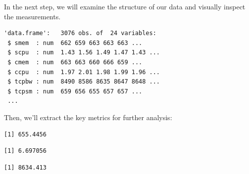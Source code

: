 In the next step, we will examine the structure of our data and visually
inspect the measurements.

\begin{Shaded}
\begin{Highlighting}[]
\end{Highlighting}
\end{Shaded}

\begin{verbatim}
'data.frame':   3076 obs. of  24 variables:
 $ smem  : num  662 659 663 663 663 ...
 $ scpu  : num  1.43 1.56 1.49 1.47 1.43 ...
 $ cmem  : num  663 663 660 666 659 ...
 $ ccpu  : num  1.97 2.01 1.98 1.99 1.96 ...
 $ tcpbw : num  8490 8586 8635 8647 8648 ...
 $ tcpsm : num  659 656 655 657 657 ...
 ...
\end{verbatim}

Then, we'll extract the key metrics for further analysis:

\begin{Shaded}
\begin{Highlighting}[]
\SpecialCharTok{\$}
\end{Highlighting}
\end{Shaded}

\begin{verbatim}
[1] 655.4456
\end{verbatim}

\begin{Shaded}
\begin{Highlighting}[]
\SpecialCharTok{\$}
\end{Highlighting}
\end{Shaded}

\begin{verbatim}
[1] 6.697056
\end{verbatim}

\begin{Shaded}
\begin{Highlighting}[]
\SpecialCharTok{\$}
\end{Highlighting}
\end{Shaded}

\begin{verbatim}
[1] 8634.413
\end{verbatim}

\begin{Shaded}
\begin{Highlighting}[]
\SpecialCharTok{\$}
\end{Highlighting}
\end{Shaded}

